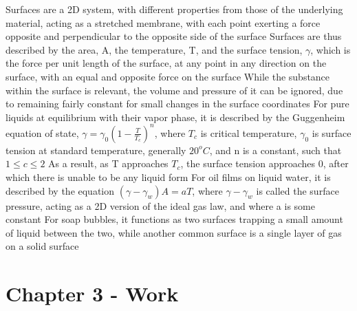\documentclass[11 pt, twoside]{article}
\newenvironment{outline*}
{
	\begin{outline}[enumerate]
	}
	{\end{outline}
}
\begin{document}
\begin{outline*}
\1 Surfaces are a 2D system, with different properties from those of the underlying material, acting as a stretched membrane, with each point exerting a force opposite and perpendicular to the opposite side of the surface
\2 Surfaces are thus described by the area, A, the temperature, T, and the surface tension, $\gamma$, which is the force per unit length of the surface, at any point in any direction on the surface, with an equal and opposite force on the surface
\2 While the substance within the surface is relevant, the volume and pressure of it can be ignored, due to remaining fairly constant for small changes in the surface coordinates
\2 For pure liquids at equilibrium with their vapor phase, it is described by the Guggenheim equation of state, $\gamma = \gamma_0(1 - \frac{T}{T_c})^n$, where $T_c$ is critical temperature, $\gamma_0$ is surface tension at standard temperature, generally $20^o C$, and n is a constant, such that $1 \leq c \leq 2$
\3 As a result, as T approaches $T_c$, the surface tension approaches 0, after which there is unable to be any liquid form
\2 For oil films on liquid water, it is described by the equation $(\gamma - \gamma_w)A = aT$, where $\gamma - \gamma_w$ is called the surface pressure, acting as a 2D version of the ideal gas law, and where a is some constant
\2 For soap bubbles, it functions as two surfaces trapping a small amount of liquid between the two, while another common surface is a single layer of gas on a solid surface
\end{outline*}
\section{Chapter 3 - Work}
\end{document}
